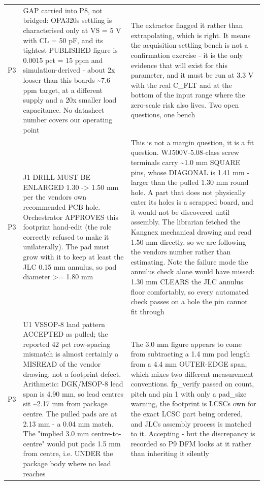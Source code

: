 \documentclass[11pt,a4paper]{article}
\begin{document}
{\begin{longtable}{lp{5.2cm}p{7.2cm}}
P3 & GAP carried into P8, not bridged: OPA320s settling is characterised only at VS = 5 V with CL = 50 pF, and its tightest PUBLISHED figure is 0.0015 pct = 15 ppm and simulation-derived - about 2x looser than this boards \textasciitilde{}7.6 ppm target, at a different supply and a 20x smaller load capacitance. No datasheet number covers our operating point & The extractor flagged it rather than extrapolating, which is right. It means the acquisition-settling bench is not a confirmation exercise - it is the only evidence that will exist for this parameter, and it must be run at 3.3 V with the real C\_FLT and at the bottom of the input range where the zero-scale risk also lives. Two open questions, one bench \\
P3 & J1 DRILL MUST BE ENLARGED 1.30 -\textgreater{} 1.50 mm per the vendors own recommended PCB hole. Orchestrator APPROVES this footprint hand-edit (the role correctly refused to make it unilaterally). The pad must grow with it to keep at least the JLC 0.15 mm annulus, so pad diameter \textgreater{}= 1.80 mm & This is not a margin question, it is a fit question. WJ500V-5.08-class screw terminals carry \textasciitilde{}1.0 mm SQUARE pins, whose DIAGONAL is 1.41 mm - larger than the pulled 1.30 mm round hole. A part that does not physically enter its holes is a scrapped board, and it would not be discovered until assembly. The librarian fetched the Kangnex mechanical drawing and read 1.50 mm directly, so we are following the vendors number rather than estimating. Note the failure mode the annulus check alone would have missed: 1.30 mm CLEARS the JLC annulus floor comfortably, so every automated check passes on a hole the pin cannot fit through \\
P3 & U1 VSSOP-8 land pattern ACCEPTED as pulled; the reported 42 pct row-spacing mismatch is almost certainly a MISREAD of the vendor drawing, not a footprint defect. Arithmetic: DGK/MSOP-8 lead span is 4.90 mm, so lead centres sit \textasciitilde{}2.17 mm from package centre. The pulled pads are at 2.13 mm - a 0.04 mm match. The "implied 3.0 mm centre-to-centre" would put pads 1.5 mm from centre, i.e. UNDER the package body where no lead reaches & The 3.0 mm figure appears to come from subtracting a 1.4 mm pad length from a 4.4 mm OUTER-EDGE span, which mixes two different measurement conventions. fp\_verify passed on count, pitch and pin 1 with only a pad\_size warning, the footprint is LCSCs own for the exact LCSC part being ordered, and JLCs assembly process is matched to it. Accepting - but the discrepancy is recorded so P9 DFM looks at it rather than inheriting it silently \\

\end{longtable}}
\end{document}
